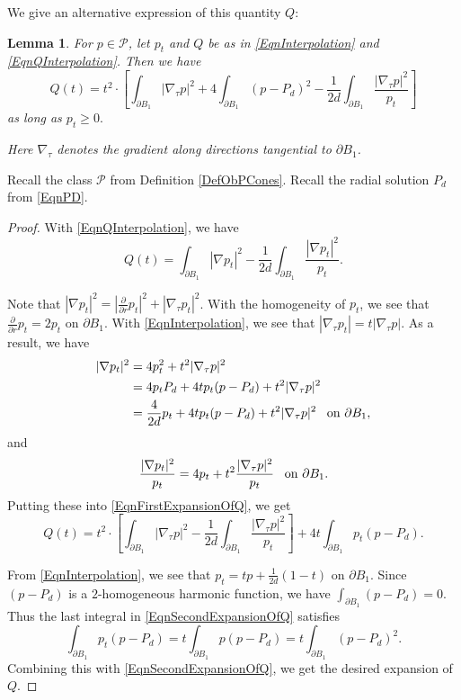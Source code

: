 \documentclass{amsart}
\def\PB{\partial B_1}
\def\P{\mathcal{P}}
\def\hem{\hspace{0.5em}}
\def\vem{\vspace{0.6em}}
\newtheorem{lem}[thm]{Lemma}
\theoremstyle{definition}
\numberwithin{equation}{section}
\theoremstyle{remark}
\begin{document}
We give an alternative expression of this quantity $Q$:
\begin{lem}
\label{LemMeaningfulQ}
For $p\in\P$, let $p_t$ and $Q$ be as in \eqref{EqnInterpolation} and \eqref{EqnQInterpolation}. Then we have
$$
Q(t)=t^2\cdot[\int_{\partial B_1}|\nabla_\tau p|^2+4\int_{\partial B_1}(p-P_d)^2-\frac{1}{2d}\int_{\partial B_1}\frac{|\nabla_\tau p|^2}{p_t}]
$$
as long as $p_t\ge0.$ 

Here $\nabla_\tau$ denotes the gradient along directions tangential to $\PB$.
\end{lem} 
Recall the class $\P$ from Definition \ref{DefObPCones}. Recall the radial solution $P_d$ from \eqref{EqnPD}.
\begin{proof}
With \eqref{EqnQInterpolation}, we have
\begin{equation}
\label{EqnFirstExpansionOfQ}
Q(t)=\int_{\PB}|\nabla p_t|^2-\frac{1}{2d}\int_{\PB}\frac{|\nabla p_t|^2}{p_t}.
\end{equation}

Note that $|\nabla p_t|^2=|\frac{\partial}{\partial r}p_t|^2+|\nabla_\tau p_t|^2$. 
With the homogeneity of $p_t$, we see that $\frac{\partial}{\partial r}p_t=2p_t$ on $\PB$. With \eqref{EqnInterpolation}, we see that $|\nabla_\tau p_t|=t|\nabla_\tau p|$. As a result, we have
\begin{align*}
|\nabla p_t|^2&=4p_t^2+t^2|\nabla_\tau p|^2\\
&=4p_tP_d+4tp_t(p-P_d)+t^2|\nabla_\tau p|^2\\
&=\frac{4}{2d}p_t+4tp_t(p-P_d)+t^2|\nabla_\tau p|^2 \hem\text{ on }\PB,
\end{align*}
and
$$
\frac{|\nabla p_t|^2}{p_t}=4p_t+t^2\frac{|\nabla_\tau p|^2}{p_t} \hem\text{ on }\PB.
$$
Putting these into \eqref{EqnFirstExpansionOfQ}, we get
\begin{equation}
\label{EqnSecondExpansionOfQ}
Q(t)=t^2\cdot[\int_{\PB}|\nabla_\tau p|^2-\frac{1}{2d}\int_{\PB}\frac{|\nabla_\tau p|^2}{p_t}]+4t\int_{\PB}p_t(p-P_d).
\end{equation}

\vem

From \eqref{EqnInterpolation}, we see that $p_t=tp+\frac{1}{2d}(1-t)$ on $\PB$. Since $(p-P_d)$ is a $2$-homogeneous harmonic function, we have
$
\int_{\PB}(p-P_d)=0.
$
Thus the last integral in \eqref{EqnSecondExpansionOfQ} satisfies
$$
\int_{\PB}p_t(p-P_d)=t\int_{\PB}p(p-P_d)=t\int_{\PB}(p-P_d)^2.
$$
Combining this with \eqref{EqnSecondExpansionOfQ}, we get the desired expansion of $Q$. 
\end{proof} 
\end{document}
